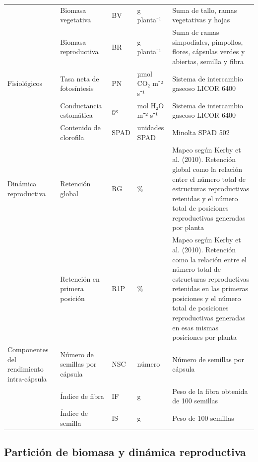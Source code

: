 \documentclass[12pt,oneside]{reedthesis}
\begin{document}
\begin{landscape}
\begin{table}[!h]
\begin{tabular}[t]{>{\raggedright\arraybackslash}p{5.3cm}>{\raggedright\arraybackslash}p{5.5cm}>{\raggedright\arraybackslash}p{1.0cm}>{\raggedright\arraybackslash}p{2.0cm}>{\raggedright\arraybackslash}p{8.8cm}}
\hspace{1em} & Biomasa vegetativa & BV & g planta⁻¹ & Suma de tallo, ramas vegetativas y hojas\\
\hspace{1em} & Biomasa reproductiva & BR & g planta⁻¹ & Suma de ramas simpodiales, pimpollos, flores, cápsulas verdes y abiertas, semilla y fibra\\
\hspace{1em}Fisiológicos & Tasa neta de fotosíntesis & PN & µmol CO₂ m⁻² s⁻¹ & Sistema de intercambio gaseoso LICOR 6400\\
\hspace{1em} & Conductancia estomática & gs & mol H₂O m⁻² s⁻¹ & Sistema de intercambio gaseoso LICOR 6400\\
\hspace{1em} & Contenido de clorofila & SPAD & unidades SPAD & Minolta SPAD 502\\
\hspace{1em}Dinámica reproductiva & Retención global & RG & \% & Mapeo según Kerby et al. (2010). Retención global como la relación entre el número total de estructuras reproductivas retenidas y el número total de posiciones reproductivas generadas por planta\\
\hspace{1em} & Retención en primera posición & R1P & \% & Mapeo según Kerby et al. (2010). Retención como la relación entre el número total de estructuras reproductivas retenidas en las primeras posiciones y el número total de posiciones reproductivas generadas en esas mismas posiciones por planta\\
\hspace{1em}Componentes del rendimiento intra-cápsula & Número de semillas por cápsula & NSC & número & Número de semillas por cápsula\\
\hspace{1em} & Índice de fibra & IF & g & Peso de la fibra obtenida de 100 semillas\\
\hspace{1em} & Índice de semilla & IS & g & Peso de 100 semillas\\
\bottomrule
\end{tabular}
\end{table}
\end{landscape}

\subsection{Partición de biomasa y dinámica reproductiva}\label{particiuxf3n-de-biomasa-y-dinuxe1mica-reproductiva}
\end{document}
